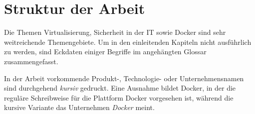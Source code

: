 \documentclass[../main.tex]{subfiles}
\begin{document}
\chapter{Struktur der Arbeit}
\label{structure}

Die Themen Virtualisierung, Sicherheit in der IT sowie Docker sind sehr weitreichende Themengebiete. Um in den einleitenden Kapiteln nicht ausführlich zu werden, sind Eckdaten einiger Begriffe im angehängten Glossar zusammengefasst.

In der Arbeit vorkommende Produkt-, Technologie- oder Unternehmensnamen sind durchgehend \emph{kursiv} gedruckt. Eine Ausnahme bildet Docker, in der die reguläre Schreibweise für die Plattform Docker vorgesehen ist, während die kursive Variante das Unternehmen \emph{Docker} meint.
\end{document}
